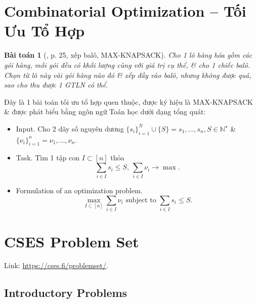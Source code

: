 \documentclass{article}
\newtheorem{baitoan}{Bài toán}
\begin{document}

\section{Combinatorial Optimization -- Tối Ưu Tổ Hợp}

\begin{baitoan}[\cite{Thanh_computational_complexity_theory}, p. 25, xếp balô, MAX-KNAPSACK]
	Cho 1 lô hàng hóa gồm các gói hàng, mỗi gói đều có khối lượng cùng với giá trị cụ thể, \& cho 1 chiếc balô. Chọn từ lô này vài gói hàng nào đó \& xếp đầy vào balô, nhưng không được quá, sao cho thu được 1 {\rm GTLN} có thể.
\end{baitoan}
Đây là 1 bài toán tối ưu tổ hợp quen thuộc, được ký hiệu là MAX-KNAPSACK \& được phát biểu bằng ngôn ngữ Toán học dưới dạng tổng quát:
\begin{itemize}
	\item {\sf Input.} Cho 2 dãy số nguyên dương $\{s_i\}_{i=1}^N\cup\{S\} = s_1,\ldots,s_n,S\in\mathbb{N}^\star$ \& $\{\nu_i\}_{i=1}^n = \nu_1,\ldots,\nu_n$.
	\item {\sf Task.} Tìm 1 tập con $I\subset[n]$ thỏa
	\begin{equation*}
		\sum_{i\in I} s_i\le S,\ \sum_{i\in I} \nu_i\to\max.
	\end{equation*}
	\item {\sf Formulation of an optimization problem.}
	\begin{equation*}
		\max_{I\subset[n]}\sum_{i\in I} \nu_i\mbox{ subject to }\sum_{i\in I} s_i\le S.
	\end{equation*}
\end{itemize}


\section{CSES Problem Set}
Link: \url{https://cses.fi/problemset/}.

\subsection{Introductory Problems}
\end{document}
